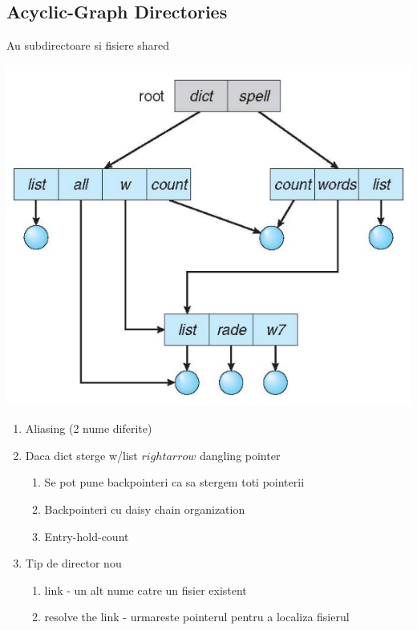 \documentclass{article}
\begin{document}
\subsection*{Acyclic-Graph Directories}
Au subdirectoare si fisiere shared
\begin{center}
    \includegraphics[scale=0.4]{45-agd.png}
\end{center}

\begin{enumerate}
    \item Aliasing (2 nume diferite)
    \item Daca dict sterge w/list $rightarrow$ dangling pointer
    \begin{enumerate}
        \item Se pot pune backpointeri ca sa stergem toti pointerii
        \item Backpointeri cu daisy chain organization
        \item Entry-hold-count
    \end{enumerate}
    \item Tip de director nou
    \begin{enumerate}
        \item link - un alt nume catre un fisier existent
        \item resolve the link - urmareste pointerul pentru a localiza fisierul
    \end{enumerate}
\end{enumerate}
\end{document}
